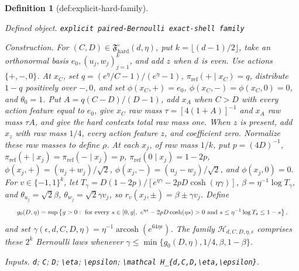 \documentclass{article}
\newtheorem{definition}{Definition}
\begin{document}
\begin{definition}[def:explicit-hard-family]\label{def:explicit-hard-family}
\par\smallskip\noindent\emph{Defined object.} \texttt{explicit paired-\allowbreak{}Bernoulli exact-\allowbreak{}shell family}
\par\smallskip\noindent\emph{Construction.} For \((C,D)\in\mathfrak F_{\mathrm{hard}}^\circ(d,\eta)\), put \(k=\lfloor(d-1)/2\rfloor\), take an orthonormal basis \(e_0,(u_j,w_j)_{j=1}^k\), and add \(z\) when \(d\) is even. Use actions \(\{+,-,0\}\). At \(x_C\), set \(q=(e^\eta/C-1)/(e^\eta-1)\), \(\pi_{\mathrm{ref}}(+\mid x_C)=q\), distribute \(1-q\) positively over \(-,0\), and set \(\phi(x_C,+)=e_0\), \(\phi(x_C,-)=\phi(x_C,0)=0\), and \(\theta_0=1\). Put \(A=q(C-D)/(D-1)\), add \(x_A\) when \(C>D\) with every action feature equal to \(e_0\), give \(x_C\) raw mass \(\tau=[4(1+A)]^{-1}\) and \(x_A\) raw mass \(\tau A\), and give the hard contexts total raw mass one. When \(z\) is present, add \(x_z\) with raw mass \(1/4\), every action feature \(z\), and coefficient zero. Normalize these raw masses to define \(\rho\). At each \(x_j\), of raw mass \(1/k\), put \(p=(4D)^{-1}\), \(\pi_{\mathrm{ref}}(+\mid x_j)=\pi_{\mathrm{ref}}(-\mid x_j)=p\), \(\pi_{\mathrm{ref}}(0\mid x_j)=1-2p\), \(\phi(x_j,+)=(u_j+w_j)/\sqrt2\), \(\phi(x_j,-)=(u_j-w_j)/\sqrt2\), and \(\phi(x_j,0)=0\). For \(v\in\{-1,1\}^k\), let \(T_\gamma=D(1-2p)/[e^{\eta\gamma}-2pD\cosh(\eta\gamma)]\), \(\beta=\eta^{-1}\log T_\gamma\), and \(\theta_{u_j}=\sqrt2\beta\), \(\theta_{w_j}=\sqrt2\gamma v_j\), so \(r_v(x_j,\pm)=\beta\pm\gamma v_j\). Define
\[
\makebox[\linewidth][c]{\resizebox{0.98\linewidth}{!}{\par\noindent \makebox[\linewidth][c]{\resizebox{0.98\linewidth}{!}{\(\displaystyle \displaystyle g_0(D,\eta)=\sup\left\{g>0:\text{ for every }s\in[0,g],\ e^{\eta s}-2pD\cosh(\eta s)>0\text{ and }s\le\eta^{-1}\log T_s\le1-s\right\},\)}}\par\noindent}}
\]
and set \(\gamma(\epsilon,d,C,D,\eta)=\eta^{-1}\operatorname{arcosh}(e^{64\eta\epsilon})\). The family \(\mathcal H_{d,C,D,\eta,\epsilon}\) comprises these \(2^k\) Bernoulli laws whenever \(\gamma\le\min\{g_0(D,\eta),1/4,\beta,1-\beta\}\).
\par\smallskip\noindent\emph{Inputs.} \texttt{d}; \texttt{C}; \texttt{D}; \texttt{\textbackslash{}\allowbreak{}eta}; \texttt{\textbackslash{}\allowbreak{}epsilon}; \texttt{\textbackslash{}\allowbreak{}mathcal H\_\allowbreak{}\{d,\allowbreak{}C,\allowbreak{}D,\allowbreak{}\textbackslash{}\allowbreak{}eta,\allowbreak{}\textbackslash{}\allowbreak{}epsilon\}\allowbreak{}}.
\end{definition}
\end{document}
